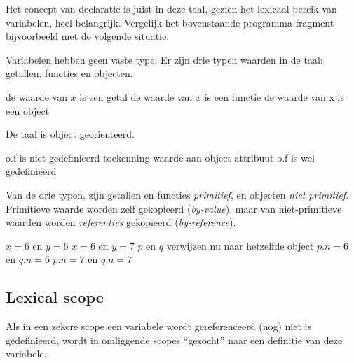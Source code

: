 Het concept van declaratie is juist in deze taal, gezien het lexicaal bereik van variabelen, heel belangrijk. Vergelijk het bovenstaande programma fragment bijvoorbeeld met de volgende situatie.

Variabelen hebben geen vaste type. Er zijn drie typen waarden in de taal: getallen, functies en objecten.

	\begin{CodeFragment}
		                      {}
		                       {de waarde van $x$ is een getal}
		   {de waarde van $x$ is een functie}
		                   {de waarde van x is een object}
	\end{CodeFragment}

De taal is object georienteerd.

	\begin{CodeFragment}
		                      {}
		                   {}
		\Line{}                            {o.f is niet gedefinieerd}
		 {toekenning waarde aan object attribuut}
		\Line{}                            {o.f is wel gedefinieerd}
		                     {}
	\end{CodeFragment}

Van de drie typen, zijn getallen en functies \emph{primitief}, en objecten \emph{niet primitief}. Primitieve waarde worden zelf gekopieerd (\emph{by-value}), maar van niet-primitieve waarden worden \emph{referenties} gekopieerd (\emph{by-reference}).

	\begin{CodeFragment}
		             {}
		             {$x = 6$ en $y = 6$}
		                       {$x = 6$ en $y = 7$}
		\Line{}                            {}
		           {}
		             {$p$ en $q$ verwijzen nu naar hetzelfde object}
		\Line{}                            {$p.n = 6$ en $q.n = 6$}
		                     {$p.n = 7$ en $q.n = 7$}
	\end{CodeFragment}

\subsection{Lexical scope}

Als in een zekere scope een variabele wordt gereferenceerd (nog) niet is gedefinieerd, wordt in omliggende scopes ``gezocht'' naar een definitie van deze variabele.

